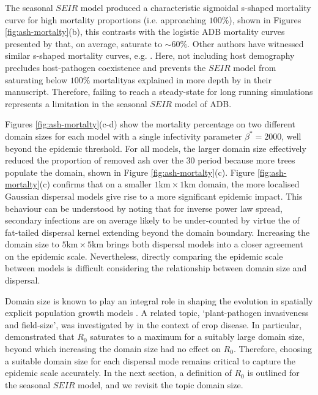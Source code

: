 The seasonal $SEIR$ model produced a characteristic sigmoidal s-shaped mortality curve for high mortality proportions 
(i.e. approaching $100\%$), shown in Figures \ref{fig:ash-mortalty}(b), this contrasts with the logistic ADB mortality 
curves presented by \cite{https://doi.org/10.1002/ppp3.11} that, on average, saturate to $\sim 60 \%$.
Other authors have witnessed similar s-shaped mortality curves, e.g. \cite{lohmus2014ash}.
Here, not including host demography precludes host-pathogen coexistence and prevents the $SEIR$ model from saturating below
$100\%$ mortality\textemdash as explained in more depth by \cite{time-varying-infectivity} in their manuscript.
Therefore, failing to reach a steady-state for long running simulations represents a limitation in the seasonal $SEIR$ model of ADB.

Figures \ref{fig:ash-mortalty}(c-d) show the mortality percentage on two different domain sizes for each model with a single infectivity parameter $\beta^*=2000$, well beyond the epidemic threshold.
For all models, the larger domain size effectively reduced the proportion of removed ash over the $30$ period because more trees populate the domain, shown in Figure \ref{fig:ash-mortalty}(c).
Figure \ref{fig:ash-mortalty}(c) confirms that on a smaller $1\mathrm{km}\times 1\mathrm{km}$ domain, the more localised Gaussian dispersal models give rise to a more significant epidemic impact.
This behaviour can be understood by noting that for inverse power law spread, secondary infections are on average likely to be under-counted
by virtue the of fat-tailed dispersal kernel extending beyond the domain boundary.
Increasing the domain size to $5\mathrm{km}\times 5\mathrm{km}$ brings both dispersal models into a closer agreement on the epidemic scale.
Nevertheless, directly comparing the epidemic scale between models is difficult considering the relationship between domain size and dispersal.

Domain size is known to play an integral role in shaping the evolution in spatially explicit population growth models \cite{tang2011asymptotic}.
A related topic, `plant-pathogen invasiveness and field-size', was investigated by \cite{mikaberidze2016invasiveness} in the context of crop disease.
In particular, \cite{mikaberidze2016invasiveness} demonstrated that $R_0$ saturates to a maximum for a suitably large domain size, beyond which increasing the domain size had no effect on $R_0$.
Therefore, choosing a suitable domain size for each dispersal mode remains critical to capture the epidemic scale accurately.
In the next section, a definition of $R_0$ is outlined for the seasonal $SEIR$ model, and we revisit the topic domain size.


